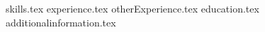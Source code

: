 \documentclass[8pt, letterpaper]{awesome-cv}
\newcommand*{\sectiondir}{resume/}
\begin{document}
\makecvheader


{skills.tex}
{experience.tex}
{otherExperience.tex}
{education.tex}
{additionalinformation.tex}
\end{document}
